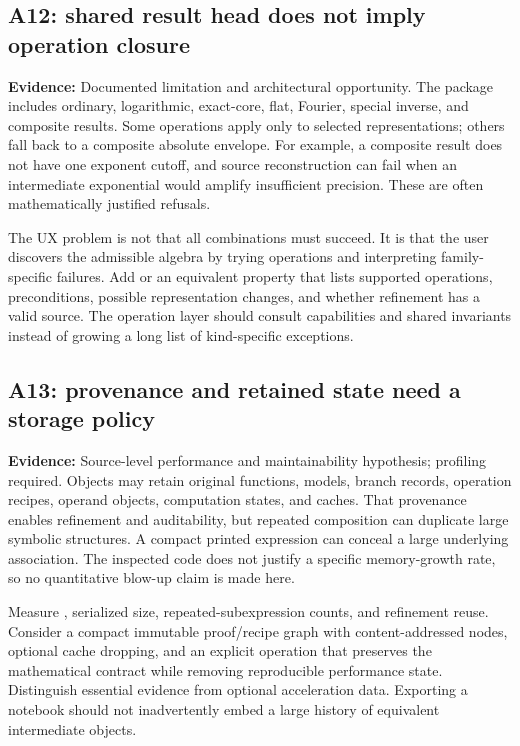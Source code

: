 \documentclass[11pt,a4paper]{article}
\newcommand{\code}[1]{\texttt{\detokenize{#1}}}
\newcommand{\status}[1]{\textbf{Evidence:} #1.}
\theoremstyle{remark}\newtheorem{remark}[proposition]{Remark}
\begin{document}
\subsection{A12: shared result head does not imply operation closure}
\status{Documented limitation and architectural opportunity}
The package includes ordinary, logarithmic, exact-core, flat, Fourier, special inverse, and composite results. Some operations apply only to selected representations; others fall back to a composite absolute envelope. For example, a composite result does not have one exponent cutoff, and source reconstruction can fail when an intermediate exponential would amplify insufficient precision. These are often mathematically justified refusals.\cite{arithmetic,sourcecharts,guide}

The UX problem is not that all combinations must succeed. It is that the user discovers the admissible algebra by trying operations and interpreting family-specific failures. Add \code{SeriesCapabilities[s]} or an equivalent property that lists supported operations, preconditions, possible representation changes, and whether refinement has a valid source. The operation layer should consult capabilities and shared invariants instead of growing a long list of kind-specific exceptions.

\subsection{A13: provenance and retained state need a storage policy}
\status{Source-level performance and maintainability hypothesis; profiling required}
Objects may retain original functions, models, branch records, operation recipes, operand objects, computation states, and caches. That provenance enables refinement and auditability, but repeated composition can duplicate large symbolic structures. A compact printed expression can conceal a large underlying association. The inspected code does not justify a specific memory-growth rate, so no quantitative blow-up claim is made here.\cite{arithmetic,incremental,inverseexpressions,gamma}

Measure \code{ByteCount}, serialized size, repeated-subexpression counts, and refinement reuse. Consider a compact immutable proof/recipe graph with content-addressed nodes, optional cache dropping, and an explicit \code{CompactSeries} operation that preserves the mathematical contract while removing reproducible performance state. Distinguish essential evidence from optional acceleration data. Exporting a notebook should not inadvertently embed a large history of equivalent intermediate objects.
\end{document}

